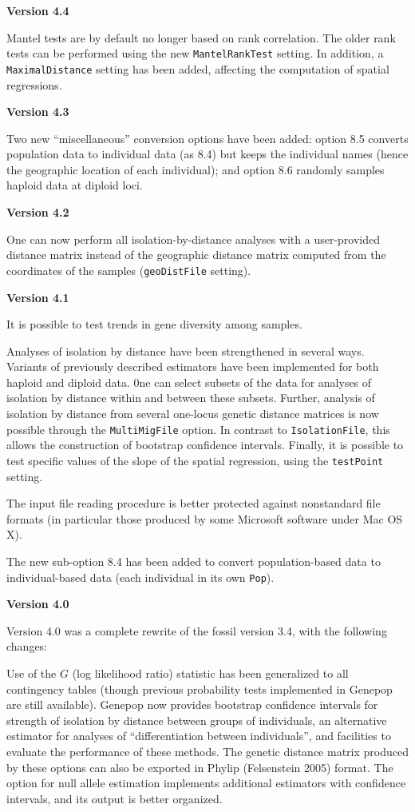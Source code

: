 \documentclass[12pt,]{book}
\theoremstyle{definition}
\theoremstyle{definition}
\theoremstyle{definition}
\theoremstyle{remark}
\begin{document}
\textbf{Version 4.4}

Mantel tests are by default no longer based on rank correlation. The
older rank tests can be performed using the new \texttt{MantelRankTest}
setting. In addition, a \texttt{MaximalDistance} setting has been added,
affecting the computation of spatial regressions.

\textbf{Version 4.3}

Two new ``miscellaneous'' conversion options have been added: option 8.5
converts population data to individual data (as 8.4) but keeps the
individual names (hence the geographic location of each individual); and
option 8.6 randomly samples haploid data at diploid loci.

\textbf{Version 4.2}

One can now perform all isolation-by-distance analyses with a
user-provided distance matrix instead of the geographic distance matrix
computed from the coordinates of the samples (\texttt{geoDistFile}
setting).

\textbf{Version 4.1}

It is possible to test trends in gene diversity among samples.

Analyses of isolation by distance have been strengthened in several
ways. Variants of previously described estimators have been implemented
for both haploid and diploid data. 0ne can select subsets of the data
for analyses of isolation by distance within and between these subsets.
Further, analysis of isolation by distance from several one-locus
genetic distance matrices is now possible through the
\texttt{MultiMigFile} option. In contrast to \texttt{IsolationFile},
this allows the construction of bootstrap confidence intervals. Finally,
it is possible to test specific values of the slope of the spatial
regression, using the \texttt{testPoint} setting.

The input file reading procedure is better protected against nonstandard
file formats (in particular those produced by some Microsoft software
under Mac OS X).

The new sub-option 8.4 has been added to convert population-based data
to individual-based data (each individual in its own \texttt{Pop}).

\textbf{Version 4.0}

Version 4.0 was a complete rewrite of the fossil version 3.4, with the
following changes:

Use of the \(G\) (log likelihood ratio) statistic has been generalized
to all contingency tables (though previous probability tests implemented
in Genepop are still available). Genepop now provides bootstrap
confidence intervals for strength of isolation by distance between
groups of individuals, an alternative estimator for analyses of
``differentiation between individuals'', and facilities to evaluate the
performance of these methods. The genetic distance matrix produced by
these options can also be exported in Phylip (Felsenstein 2005) format.
The option for null allele estimation implements additional estimators
with confidence intervals, and its output is better organized.
\end{document}
